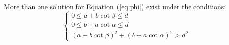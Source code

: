 \documentclass[graybox]{svmult}
\begin{document}
  

\begin{corollary} \label{4sol}


More than one solution for Equation~(\ref{eq:phi})  exist under the conditions:
  \begin{equation*}
    \begin{cases}
      0 \leq a + b \cot{\beta} \leq d \\
      0 \leq b + a \cot{\alpha} \leq d \\
      (a + b \cot{\beta})^2 + (b + a \cot{\alpha})^2 > d^2
    \end{cases}
  \end{equation*}
\end{corollary}

\end{document}
